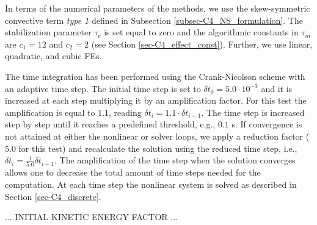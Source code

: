 In terms of the numerical parameters of the methods, we use the skew-symmetric convective term \textit{type 1} defined in Subsection \ref{subsec-C4_NS_formulation}. 
The stabilization parameter $\tau_c$ is set equal to zero and the algorithmic constants in $\tau_m$ are $c_1=12$ and $c_2=2$ (see Section \ref{sec-C4_effect_const}).
Further, we use linear, quadratic, and cubic FEs.

The time integration has been performed using the Crank-Nicolson scheme with an adaptive time step. The initial time step is set to $\delta t_0=5.0\cdot10^{-3}$ and it is increased at each step multiplying it by an amplification factor. For this test the amplification is equal to $1.1$, reading $\delta t_i=1.1\cdot\delta t_{i-1}$. The time step is increased step by step until it reaches a predefined threshold, e.g., $0.1$ s. If convergence is not attained at either the nonlinear or solver loops,  we apply a reduction factor ($5.0$ for this test) and recalculate the solution using the reduced time step, i.e., $\delta t_i=\frac{1}{5.0}\delta t_{i-1}$. The amplification of the time step when the solution converges %
allows one to decrease the total amount of time steps needed for the computation. %
At each time step the nonlinear system is solved as described in Section \ref{sec-C4_discrete}. 

... INITIAL KINETIC ENERGY FACTOR ...

